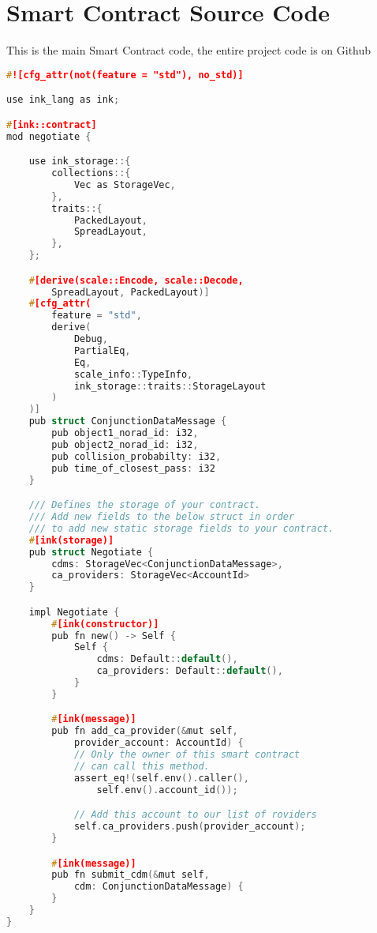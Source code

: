 \chapter{Smart Contract Source Code}

This is the main Smart Contract code, the entire project code is on Github \cite{github}

\begin{lstlisting}[label={source},language=c,caption={Smart Contract}]
#![cfg_attr(not(feature = "std"), no_std)]

use ink_lang as ink;

#[ink::contract]
mod negotiate {

    use ink_storage::{
        collections::{
            Vec as StorageVec,
        },
        traits::{
            PackedLayout,
            SpreadLayout,
        },
    };

    #[derive(scale::Encode, scale::Decode, 
        SpreadLayout, PackedLayout)]
    #[cfg_attr(
        feature = "std",
        derive(
            Debug,
            PartialEq,
            Eq,
            scale_info::TypeInfo,
            ink_storage::traits::StorageLayout
        )
    )]
    pub struct ConjunctionDataMessage {
        pub object1_norad_id: i32,
        pub object2_norad_id: i32,
        pub collision_probabilty: i32,
        pub time_of_closest_pass: i32
    }

    /// Defines the storage of your contract.
    /// Add new fields to the below struct in order
    /// to add new static storage fields to your contract.
    #[ink(storage)]
    pub struct Negotiate {
        cdms: StorageVec<ConjunctionDataMessage>,
        ca_providers: StorageVec<AccountId>
    }

    impl Negotiate {
        #[ink(constructor)]
        pub fn new() -> Self {
            Self { 
                cdms: Default::default(), 
                ca_providers: Default::default(), 
            }
        }

        #[ink(message)]
        pub fn add_ca_provider(&mut self, 
            provider_account: AccountId) {
            // Only the owner of this smart contract 
            // can call this method.
            assert_eq!(self.env().caller(), 
                self.env().account_id());

            // Add this account to our list of roviders
            self.ca_providers.push(provider_account);
        }

        #[ink(message)]
        pub fn submit_cdm(&mut self, 
            cdm: ConjunctionDataMessage) {
        }
    }
}
\end{lstlisting}